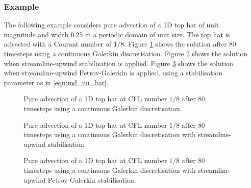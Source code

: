 \subsubsection{Example}

The following example considers pure advection of a 1D top hat of unit magnitude
and width 0.25 in a periodic domain of unit size. The top hat is advected with a
Courant number of $1 / 8$. Figure \ref{fig:top_hat_cg} shows the solution after
80 timesteps using a continuous Galerkin discretisation. Figure \ref{fig:top_hat_su}
shows the solution when streamline-upwind stabilisation is applied.
Figure \ref{fig:top_hat_supg} shows the solution when streamline-upwind
Petrov-Galerkin is applied, using a stabilisation parameter as in \eqref{eqn:md_nu_bar}.

\begin{figure}[ht]
  \centering
  \caption{Pure advection of a 1D top hat at CFL number $1 / 8$ after 80 timesteps
           using a continuous Galerkin discretisation.}
  \label{fig:top_hat_cg}
\end{figure}

\begin{figure}[ht]
  \centering
  \caption{Pure advection of a 1D top hat at CFL number $1 / 8$ after 80 timesteps
           using a continuous Galerkin discretisation with streamline-upwind
           stabilisation.}
  \label{fig:top_hat_su}
\end{figure}

\begin{figure}[ht]
  \centering
  \caption{Pure advection of a 1D top hat at CFL number $1 / 8$ after 80 timesteps
           using a continuous Galerkin discretisation with streamline-upwind
           Petrov-Galerkin stabilisation.}
  \label{fig:top_hat_supg}
\end{figure}

